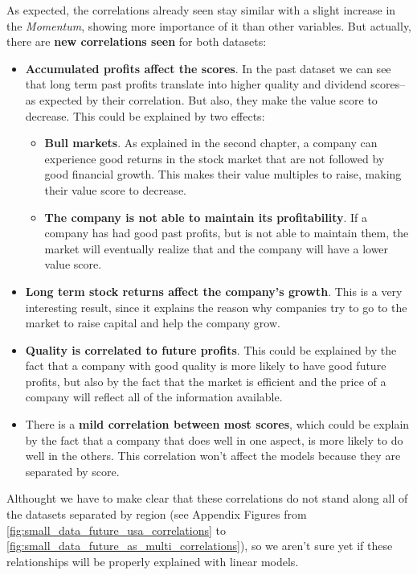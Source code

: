 \documentclass[11pt,english,a4paper,hidelinks]{book}
\begin{document}
\noindent As expected, the correlations already seen stay similar with a slight increase in the \textit{Momentum}, showing more importance of it than other variables. But actually, there are \textbf{new correlations seen} for both datasets:

\begin{itemize}
    \item  \textbf{Accumulated profits affect the scores}. In the past dataset we can see that long term past profits translate into higher quality and dividend scores-- as expected by their correlation. But also, they make the value score to decrease. This could be explained by two effects:
    \begin{itemize}
        \item \textbf{Bull markets}. As explained in the second chapter, a company can experience good returns in the stock market that are not followed by good financial growth. This makes their value multiples to raise, making their value score to decrease.
        \item \textbf{The company is not able to maintain its profitability}. If a company has had good past profits, but is not able to maintain them, the market will eventually realize that and the company will have a lower value score.
    \end{itemize}
    \item \textbf{Long term stock returns affect the company's growth}. This is a very interesting result, since it explains the reason why companies try to go to the market to raise capital and help the company grow.
    \item \textbf{Quality is correlated to future profits}. This could be explained by the fact that a company with good quality is more likely to have good future profits, but also by the fact that the market is efficient and the price of a company will reflect all of the information available.
    \item There is a \textbf{mild correlation between most scores}, which could be explain by the fact that a company that does well in one aspect, is more likely to do well in the others. This correlation won't affect the models because they are separated by score.
\end{itemize}

\noindent Althought we have to make clear that these correlations do not stand along all of the datasets separated by region (see Appendix Figures from \ref{fig:small_data_future_usa_correlations} to \ref{fig:small_data_future_as_multi_correlations}), so we aren't sure yet if these relationships will be properly explained with linear models.
\end{document}
